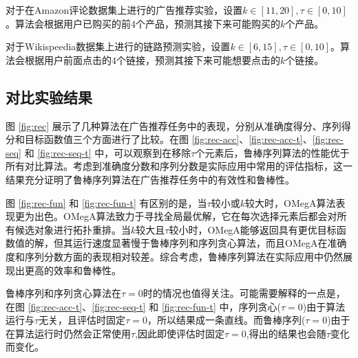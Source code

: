 对于在Amazon评论数据集上进行的广告推荐实验，设置$k\in[11,20],\tau \in[0,10]$。算法会根据用户已购买的前$4$个产品，预测其接下来可能购买的$k$个产品。

对于Wikispeedia数据集上进行的链路预测实验，设置$k\in[6,15],\tau \in[0,10]$。算法会根据用户前面点击的$4$个链接，预测其接下来可能想要点击的$k$个链接。


\subsection{对比实验结果}

图 \ref{fig:rec} 展示了几种算法在广告推荐任务中的表现，分别从准确度得分、序列得分和目标函数值三个方面进行了比较。在图 \ref{fig:rec-acc}、\ref{fig:rec-acc-t}、\ref{fig:rec-seq} 和 \ref{fig:rec-seq-t} 中，可以观察到在移除$\tau$个元素后，鲁棒序列算法的性能优于所有对比算法。考虑到准确度分数和序列分数是实际应用中常用的评估指标，这一结果充分证明了鲁棒序列算法在广告推荐任务中的有效性和鲁棒性。

图 \ref{fig:rec-fun} 和 \ref{fig:rec-fun-t} 有区别的是，当$\tau$较小或$k$较大时，OMegA算法表现更为出色。OMegA算法致力于寻找全局最优解，它在每次选择元素后都会对所有候选对象进行拓扑重排。当$k$较大且$\tau$较小时，OMegA能够返回具有更优目标函数值的解，但其运行速度显著慢于鲁棒序列和序列贪心算法，而且OMegA在准确度和序列分数方面的表现相对较差。综合考虑，鲁棒序列算法在实际应用中仍然展现出更高的效率和鲁棒性。

鲁棒序列和序列贪心算法在$\tau=0$时的情况也值得关注。可能需要解释的一点是，在图 \ref{fig:rec-acc-t}、\ref{fig:rec-seq-t} 和 \ref{fig:rec-fun-t} 中，序列贪心($\tau=0$)由于算法运行与$\tau$无关，且评估时固定$\tau=0$，所以结果成一条直线。而鲁棒序列($\tau=0$)由于在算法运行时仍然会正常使用$\tau$,因此即使评估时固定$\tau=0$,得出的结果也会随$\tau$变化而变化。


